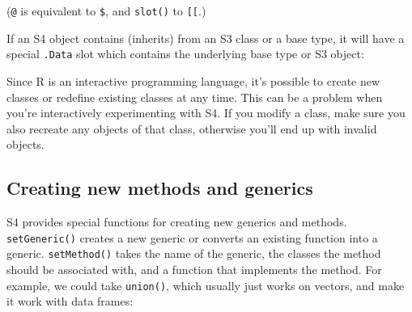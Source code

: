 (\texttt{@} is equivalent to \texttt{\$}, and \texttt{slot()} to
\texttt{{[}{[}}.)

If an S4 object contains (inherits) from an S3 class or a base type, it
will have a special \texttt{.Data} slot which contains the underlying
base type or S3 object: 

\begin{Shaded}
\begin{Highlighting}[]
\NormalTok{(}\NormalTok{,}
   \NormalTok{,}
   \NormalTok{(} \NormalTok{, } \NormalTok{))}
\StringTok{ }\NormalTok{(}\NormalTok{, }\NormalTok{:}\NormalTok{, } \NormalTok{, } \NormalTok{)}
\end{Highlighting}
\end{Shaded}

Since R is an interactive programming language, it's possible to create
new classes or redefine existing classes at any time. This can be a
problem when you're interactively experimenting with S4. If you modify a
class, make sure you also recreate any objects of that class, otherwise
you'll end up with invalid objects.

\subsection{Creating new methods and generics}

S4 provides special functions for creating new generics and methods.
\texttt{setGeneric()} creates a new generic or converts an existing
function into a generic. \texttt{setMethod()} takes the name of the
generic, the classes the method should be associated with, and a
function that implements the method. For example, we could take
\texttt{union()}, which usually just works on vectors, and make it work
with data frames:  
 

\begin{Shaded}
\begin{Highlighting}[]
\NormalTok{(}\NormalTok{)}
\NormalTok{(}\NormalTok{,}
  \NormalTok{(} \NormalTok{, } \NormalTok{),}
    \NormalTok{(}
  \NormalTok{\}}
\NormalTok{)}
\end{Highlighting}
\end{Shaded}

